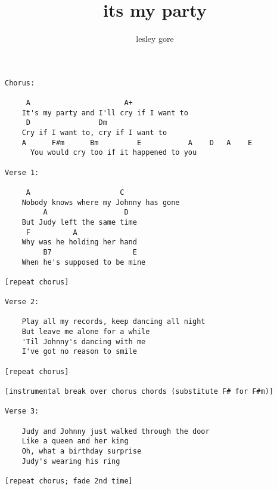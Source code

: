\author{lesley gore}
\title{its my party}
\maketitle
\begin{verbatim}
Chorus:

	 A                      A+
	It's my party and I'll cry if I want to
	 D                Dm
	Cry if I want to, cry if I want to
	A      F#m      Bm         E           A    D   A    E
	  You would cry too if it happened to you

Verse 1:

	 A                     C
	Nobody knows where my Johnny has gone
	     A                  D
	But Judy left the same time
	 F          A
	Why was he holding her hand
	     B7                   E
	When he's supposed to be mine

[repeat chorus]

Verse 2:

	Play all my records, keep dancing all night
	But leave me alone for a while
	'Til Johnny's dancing with me
	I've got no reason to smile

[repeat chorus]

[instrumental break over chorus chords (substitute F# for F#m)]

Verse 3:

	Judy and Johnny just walked through the door
	Like a queen and her king
	Oh, what a birthday surprise
	Judy's wearing his ring

[repeat chorus; fade 2nd time]
\end{verbatim}